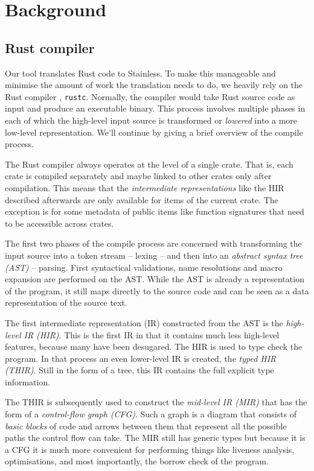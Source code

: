 \section{Background}

\subsection{Rust compiler}

Our tool translates Rust code to Stainless. To make this manageable and minimise
the amount of work the translation needs to do, we heavily rely on the Rust
compiler \cite{rustc-guide}, \passthrough{\lstinline!rustc!}. Normally, the
compiler would take Rust source code as input and produce an executable binary.
This process involves multiple phases in each of which the high-level input
source is transformed or \emph{lowered} into a more low-level representation.
We'll continue by giving a brief overview of the compile process.

The Rust compiler always operates at the level of a single crate. That
is, each crate is compiled separately and maybe linked to other crates
only after compilation. This means that the \emph{intermediate
representations} like the HIR described afterwards are only available
for items of the current crate. The exception is for some metadata of
public items like function signatures that need to be accessible across
crates.

The first two phases of the compile process are concerned with
transforming the input source into a token stream -- lexing -- and then
into an \emph{abstract syntax tree (AST)} -- parsing. First syntactical
validations, name resolutions and macro expansion are performed on the
AST. While the AST is already a representation of the program, it still
maps directly to the source code and can be seen as a data
representation of the source text.

The first intermediate representation (IR) constructed from the AST is
the \emph{high-level IR (HIR)}. This is the first IR in that it contains
much less high-level features, because many have been desugared. The HIR
is used to type check the program. In that process an even lower-level
IR is created, the \emph{typed HIR (THIR)}. Still in the form of a tree,
this IR contains the full explicit type information.

The THIR is subsequently used to construct the \emph{mid-level IR (MIR)}
that has the form of a \emph{control-flow graph (CFG)}. Such a graph is
a diagram that consists of \emph{basic blocks} of code and arrows
between them that represent all the possible paths the control flow can
take. The MIR still has generic types but because it is a CFG it is much
more convenient for performing things like liveness analysis,
optimisations, and most importantly, the borrow check of the program.

